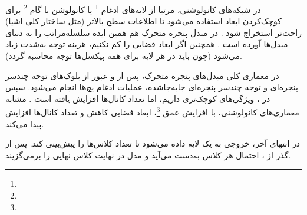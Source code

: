 در شبکه‌های کانولوشنی، مرتبا از لایه‌های ادغام \footnote{} یا کانولوشن با گام \footnote{}
برای کوچک‌کردن ابعاد استفاده می‌شود تا اطلاعات سطح بالاتر (مثل ساختار کلی اشیا) راحت‌تر استخراج شود \cite{he2016deep}. در مبدل پنجره متحرک هم همین ایده سلسله‌مراتب را به دنیای مبدل‌ها آورده است \cite{liu2021swintransformer}.
همچنین اگر ابعاد فضایی را کم نکنیم، هزینه توجه به‌شدت زیاد می‌شود
(چون باید در هر لایه برای همه پیکسل‌ها توجه محاسبه گردد).

در معماری کلی مبدل‌های پنجره متحرک، پس از  و عبور از بلوک‌های توجه چندسر پنجره‌ای و توجه چندسر پنجره‌ای جابه‌جاشده، عملیات ادغام پچ‌ها انجام می‌شود. سپس در ، ویژگی‌های کوچک‌تری داریم، اما تعداد کانال‌ها افزایش یافته است \cite{liu2021swintransformer}.
مشابه معماری‌های کانولوشنی، با افزایش عمق \footnote{}، ابعاد فضایی کاهش و تعداد کانال‌ها افزایش پیدا می‌کند.

در انتهای  آخر، خروجی به یک لایه  داده می‌شود تا تعداد کلاس‌ها را پیش‌بینی کند.
پس از گذر از ، احتمال هر کلاس به‌دست می‌آید و مدل در نهایت کلاس نهایی را برمی‌گزیند.